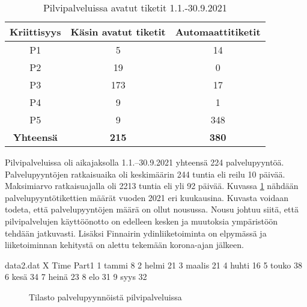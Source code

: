 \begin{table}[ht]
\centering
\begin{tabular}{||c c c||} 
 \hline
 Kriittisyys & Käsin avatut tiketit & Automaattitiketit \\ [0.5ex] 
 \hline\hline
 P1 & 5 & 14 \\ 
 P2 & 19 & 0 \\
 P3 & 173 & 17 \\
 P4 & 9 & 1 \\
 P5 & 9 & 348 \\
 \textbf{Yhteensä} & \textbf{215} & \textbf{380}\\ [1ex] 
 \hline
\end{tabular}
\caption{Pilvipalveluissa avatut tiketit 1.1.-30.9.2021}
\label{table:pilviautomaatti}
\end{table}

Pilvipalveluissa oli aikajaksolla 1.1.--30.9.2021 yhteensä 224 palvelupyyntöä. Palvelupyyntöjen ratkaisuaika oli keskimäärin 244 tuntia eli reilu 10 päivää. Maksimiarvo ratkaisuajalla oli 2213 tuntia eli yli 92 päivää. Kuvassa \ref{fig:pilvipyynto} nähdään palvelupyyntötikettien määrät vuoden 2021 eri kuukausina. Kuvasta voidaan todeta, että palvelupyyntöjen määrä on ollut nousussa. Nousu johtuu siitä, että pilvipalvelujen käyttöönotto on edelleen kesken ja muutoksia ympäristöön tehdään jatkuvasti. Lisäksi Finnairin ydinliiketoiminta on elpymässä ja liiketoiminnan kehitystä on alettu tekemään korona-ajan jälkeen.

\begin{filecontents}{data2.dat}
X Time  	Part1
1 tammi  	8
2 helmi		21
3 maalis	21
4 huhti		16
5 touko		38
6 kesä		34
7 heinä		23
8 elo       31
9 syys      32
\end{filecontents}

\begin{figure}[ht]
\caption{Tilasto palvelupyynnöistä pilvipalveluissa}
\label{fig:pilvipyynto}
\end{figure}

